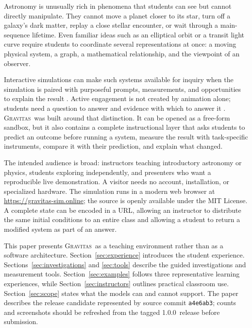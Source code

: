 \documentclass[twocolumn]{aastex631}
\newcommand{\Gravitas}{\textsc{Gravitas}}
\newcommand{\Version}{1.0.0}
\newcommand{\CodeSnapshot}{a4e6ab3}
\begin{document}
Astronomy is unusually rich in phenomena that students can see but cannot
directly manipulate. They cannot move a planet closer to its star, turn off a
galaxy's dark matter, replay a close stellar encounter, or wait through a
main-sequence lifetime. Even familiar ideas such as an elliptical orbit or a
transit light curve require students to coordinate several representations at
once: a moving physical system, a graph, a mathematical relationship, and the
viewpoint of an observer.

Interactive simulations can make such systems available for inquiry when the
simulation is paired with purposeful prompts, measurements, and opportunities
to explain the result \citep{finkelstein2005,wieman2008,rutten2012}. Active
engagement is not created by animation alone; students need a question to
answer and evidence with which to answer it \citep{hake1998,freeman2014}.
\Gravitas\ was built around that distinction. It can be opened as a free-form
sandbox, but it also contains a complete instructional layer that asks students
to predict an outcome before running a system, measure the result with
task-specific instruments, compare it with their prediction, and explain what
changed.

The intended audience is broad: instructors teaching introductory astronomy or
physics, students exploring independently, and presenters who want a
reproducible live demonstration. A visitor needs no account, installation, or
specialized hardware. The simulation runs in a modern web browser at
\url{https://gravitas-sim.online}; the source is openly available under the MIT
License. A complete state can be encoded in a URL, allowing an instructor to
distribute the same initial conditions to an entire class and allowing a student
to return a modified system as part of an answer.

This paper presents \Gravitas\ as a teaching environment rather than as a
software architecture. Section~\ref{sec:experience} introduces the student
experience. Sections~\ref{sec:investigations} and \ref{sec:tools} describe the
guided investigations and measurement tools. Section~\ref{sec:examples} follows
three representative learning experiences, while
Section~\ref{sec:instructors} outlines practical classroom use.
Section~\ref{sec:scope} states what the models can and cannot support. The paper
describes the release candidate represented by source commit
\texttt{\CodeSnapshot}; counts and screenshots should be refreshed from the
tagged \Version\ release before submission.
\end{document}
